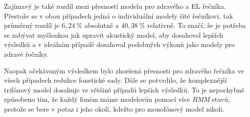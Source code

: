 Zajímavý je také rozdíl mezi přesností modelu pro zdravého a EL řečníka. Přestože se v obou případech jedná o individuální modely šité  řečníkovi, tak průměrný rozdíl je $6,24\ \%$ absolutně a $40,38\ \%$ relativně. To značí, že je potřeba se zabývat myšlenkou jak upravit akustický model, aby dosahoval lepších výsledků a v ideálním případě dosahoval podobných výkonů jako modely pro zdravé řečníky.

Naopak očekávaným výsledkem bylo zhoršená přesnosti pro zdravého řečníka ve všech případech redukce fonetické sady. Dále se potvrdilo, že komplexnější trifónový model dosahuje ve většině případů lepších výsledků. To je nepochybně způsobeno tím, že každý foném máme modelován pomocí více \textit{HMM} stavů, protože se bere v potaz i jeho okolí, kdežto pro monofónový model nikoli.
